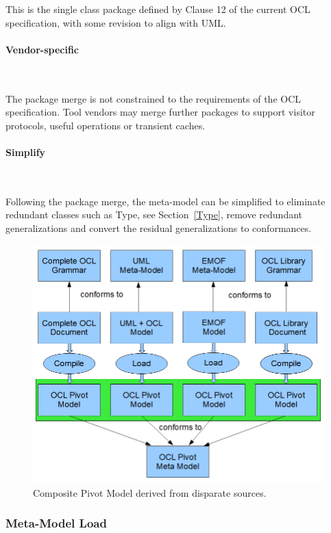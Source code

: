 \documentclass{eceasst}
\begin{document}
This is the single class package defined by Clause 12 of the current OCL specification, with some revision to align with UML. 

\paragraph{Vendor-specific}~

The package merge is not constrained to the requirements of the OCL specification. Tool vendors may merge further packages to support visitor protocols, useful operations or transient caches.

\paragraph{Simplify}~

Following the package merge, the meta-model can be simplified to eliminate redundant classes such as Type, see Section~\ref{Type}, remove redundant generalizations and convert the residual generalizations to conformances.

\begin{figure}
  \begin{center}
    \includegraphics[width=4.5in]{Load.png}
  \end{center}
  \caption{Composite Pivot Model derived from disparate sources.}
  \label{fig:Load}
\end{figure}

\subsubsection{Meta-Model Load}
\end{document}
